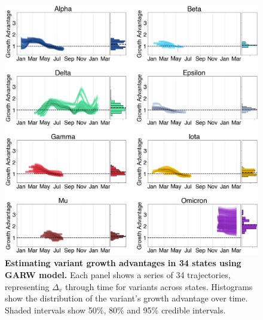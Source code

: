 \begin{figure}[h!]
  \centering
  \includegraphics[width=\linewidth]{figs/ga_consensus.png}
  \caption{\textbf{Estimating variant growth advantages in 34 states using GARW model.}
  Each panel shows a series of 34 trajectories, representing $\Delta_{v}$ through time for variants across states.
  Histograms show the distribution of the variant's growth advantage over time.
  Shaded intervals show 50\%, 80\% and 95\% credible intervals.
  }
  \label{fig:ga_consensus}
\end{figure}

%
%

